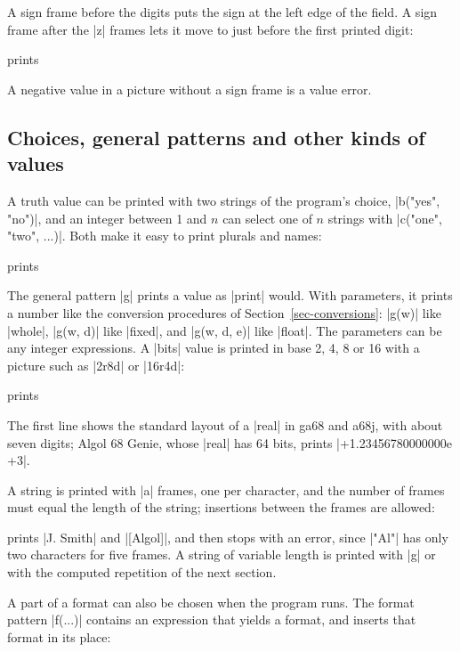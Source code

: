 A sign frame before the digits puts the sign at the left edge of the
field. A sign frame after the \code|z| frames lets it move to just before
the first printed digit:


\noindent prints

A negative value in a picture without a sign frame is a value error.

\subsection*{Choices, general patterns and other kinds of values}

A truth value can be printed with two strings of the program's choice,
\code|b("yes", "no")|, and an integer between 1 and $n$ can select one of
$n$ strings with \code|c("one", "two", ...)|. Both make it easy to print
plurals and names:


\noindent prints

The general pattern \code|g| prints a value as \code|print| would. With
parameters, it prints a number like the conversion procedures of
Section~\ref{sec-conversions}: \code|g(w)| like \code|whole|,
\code|g(w, d)| like \code|fixed|, and \code|g(w, d, e)| like
\code|float|. The parameters can be any integer expressions. A
\code|bits| value is printed in base 2, 4, 8 or 16 with a picture such as
\code|2r8d| or \code|16r4d|:


\noindent prints

The first line shows the standard layout of a \code|real| in ga68 and
a68j, with about seven digits; Algol 68 Genie, whose \code|real| has 64
bits, prints \code|+1.23456780000000e  +3|.

A string is printed with \code|a| frames, one per character, and the
number of frames must equal the length of the string; insertions between
the frames are allowed:


\noindent prints \code|J. Smith| and \code|[Algol]|, and then stops with
an error, since \code|"Al"| has only two characters for five frames. A
string of variable length is printed with \code|g| or with the
computed repetition of the next section.

A part of a format can also be chosen when the program runs. The format pattern
\code|f(...)| contains an expression that yields a format, and inserts
that format in its place:


